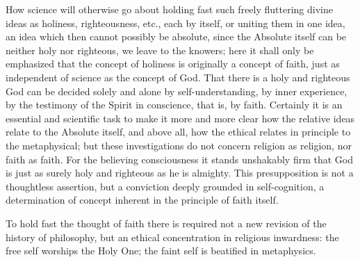 \documentclass[12pt]{book}
\newcommand{\opage}[1]{\marginnote{\footnotesize\textit{[#1]}}}
\begin{document}
How science will otherwise go about holding fast such freely fluttering
divine ideas as holiness, righteousness, etc., each by itself, or
uniting them in one idea, an idea which then cannot possibly be
absolute, since the Absolute itself can be neither holy nor righteous,
we leave to the knowers; here it shall only be emphasized that the
concept of holiness is originally a concept of faith, just as
independent of science as the concept of God. That there is a holy and
righteous God can be decided solely and alone by self-understanding, by
inner experience, by the testimony of the Spirit in
\opage{113}\setcounter{footnote}{0}%
conscience, that is, by faith. Certainly it is an essential and
scientific task to make it more and more clear how the relative ideas
relate to the Absolute itself, and above all, how the ethical relates in
principle to the metaphysical; but these investigations do not concern
religion as religion, nor faith as faith. For the believing
consciousness it stands unshakably firm that God is just as surely holy
and righteous as he is almighty. This presupposition is not a
thoughtless assertion, but a conviction deeply grounded in
self-cognition, a determination of concept inherent in the principle of
faith itself.

To hold fast the thought of faith there is required not a new revision
of the history of philosophy, but an ethical concentration in religious
inwardness: the free self worships the Holy One; the faint self is
beatified in metaphysics.
\end{document}
